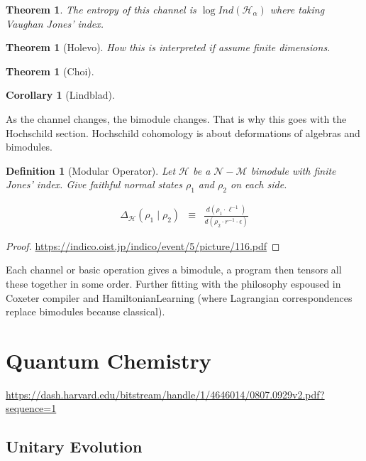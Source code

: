 \documentclass[11pt]{article}
\theoremstyle{change}
\newtheorem{definition}[equation]{Definition}
\newtheorem{theorem}[equation]{Theorem}
\newtheorem{cor}[equation]{Corollary}
\theoremstyle{nonumberplain}
\newtheorem{proof}{Proof}
\numberwithin{equation}{section}
\begin{document}
\begin{theorem}
The entropy of this channel is $\log Ind(\mathcal{H}_\alpha)$ where taking Vaughan Jones' index.
\end{theorem}

\begin{theorem}[Holevo]
How this is interpreted if assume finite dimensions.
\end{theorem}

\begin{theorem}[Choi]
\end{theorem}

\begin{cor}[Lindblad]
\end{cor}

As the channel changes, the bimodule changes. That is why this goes with the Hochschild section. Hochschild cohomology is about deformations of algebras and bimodules.

\begin{definition}[Modular Operator]
Let $\mathcal{H}$ be a $\mathcal{N} - \mathcal{M}$ bimodule with finite Jones' index. Give faithful normal states $\rho_1$ and $\rho_2$ on each side.

\begin{eqnarray*}
\Delta_\mathcal{H} (\rho_1 \mid \rho_2 ) &\equiv& \frac{d (\rho_1 \cdot \ell^{-1} )}{d (\rho_2 \cdot r^{-1} \cdot \epsilon)}
\end{eqnarray*}

\end{definition}

\begin{proof}
\url{https://indico.oist.jp/indico/event/5/picture/116.pdf}
\end{proof}

Each channel or basic operation gives a bimodule, a program then tensors all these together in some order. Further fitting with the philosophy espoused in Coxeter compiler and HamiltonianLearning (where Lagrangian correspondences replace bimodules because classical).

\section{Quantum Chemistry}

\url{https://dash.harvard.edu/bitstream/handle/1/4646014/0807.0929v2.pdf?sequence=1}

\subsection{Unitary Evolution}
\end{document}
